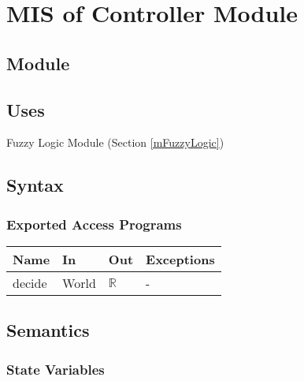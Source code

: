 \documentclass[12pt, titlepage]{article}
\begin{document}
\newpage

\section{MIS of Controller Module} \label{mController} 



\subsection{Module}


\subsection{Uses}

Fuzzy Logic Module (Section \ref{mFuzzyLogic})

\subsection{Syntax}


\subsubsection{Exported Access Programs}

\begin{center}
\begin{tabular}{p{2cm} p{4cm} p{4cm} p{2cm}}
\hline
\textbf{Name} & \textbf{In} & \textbf{Out} & \textbf{Exceptions} \\
\hline
decide & World & $\mathbb{R}$ & - \\
\hline
\end{tabular}
\end{center}

\subsection{Semantics}

\subsubsection{State Variables}
\end{document}
